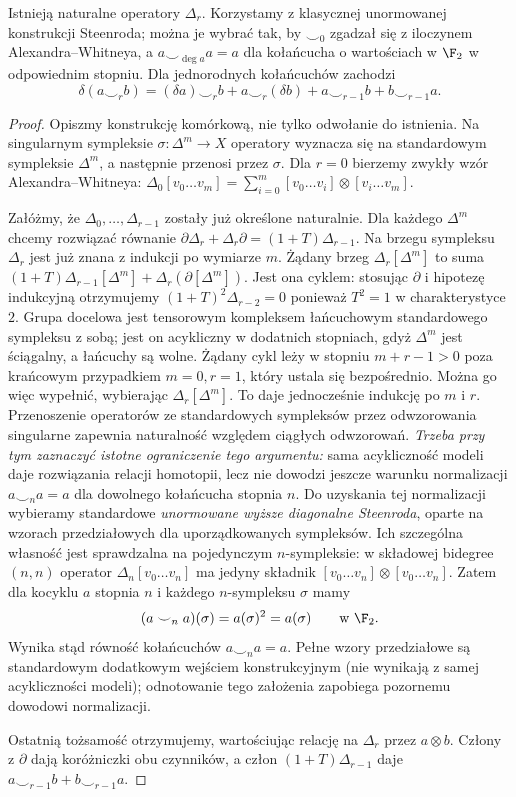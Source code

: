 \begin{lemat}
\label{lem:cup-i-v7}
Istnieją naturalne operatory $\Delta_r$. Korzystamy
z klasycznej unormowanej konstrukcji Steenroda; można je
wybrać tak, by $\smile_0$ zgadzał się z iloczynem
Alexandra--Whitneya, a $a\smile_{\deg a}a=a$
dla kołańcucha o wartościach w $\F_2$ w odpowiednim
stopniu. Dla jednorodnych kołańcuchów zachodzi
\[
\delta(a\smile_r b)=(\delta a)\smile_r b
+a\smile_r(\delta b)+a\smile_{r-1}b+b\smile_{r-1}a.
\]
\end{lemat}
\begin{proof}
Opiszmy konstrukcję komórkową, nie tylko odwołanie
do istnienia. Na singularnym sympleksie $\sigma:\Delta^m\to X$
operatory wyznacza się na standardowym sympleksie
$\Delta^m$, a następnie przenosi przez $\sigma$.
Dla $r=0$ bierzemy zwykły wzór Alexandra--Whitneya:
\(\Delta_0[v_0\dots v_m]=
\sum_{i=0}^m[v_0\dots v_i]\otimes[v_i\dots v_m]\).

Załóżmy, że $\Delta_0,\ldots,\Delta_{r-1}$
zostały już określone naturalnie. Dla każdego
$\Delta^m$ chcemy rozwiązać równanie
$\partial\Delta_r+\Delta_r\partial=(1+T)\Delta_{r-1}$.
Na brzegu sympleksu $\Delta_r$ jest już znana
z indukcji po wymiarze $m$. Żądany brzeg
$\Delta_r[\Delta^m]$ to suma
$(1+T)\Delta_{r-1}[\Delta^m]
+\Delta_r(\partial[\Delta^m])$.
Jest ona cyklem: stosując $\partial$ i hipotezę
indukcyjną otrzymujemy $(1+T)^2\Delta_{r-2}=0$
ponieważ $T^2=1$ w charakterystyce $2$.
Grupa docelowa jest tensorowym kompleksem
łańcuchowym standardowego sympleksu z sobą;
jest on acykliczny w dodatnich stopniach, gdyż
$\Delta^m$ jest ściągalny, a łańcuchy są wolne.
Żądany cykl leży w stopniu $m+r-1>0$
poza krańcowym przypadkiem $m=0,r=1$,
który ustala się bezpośrednio. Można go więc
wypełnić, wybierając $\Delta_r[\Delta^m]$.
To daje jednocześnie indukcję po $m$ i $r$.
Przenoszenie operatorów ze standardowych sympleksów przez
odwzorowania singularne zapewnia naturalność względem
ciągłych odwzorowań. \emph{Trzeba przy tym zaznaczyć
istotne ograniczenie tego argumentu:} sama acykliczność
modeli daje rozwiązania relacji homotopii, lecz nie dowodzi
jeszcze warunku normalizacji
$a\smile_n a=a$ dla dowolnego kołańcucha stopnia $n$.
Do uzyskania tej normalizacji wybieramy standardowe
\emph{unormowane wyższe diagonalne Steenroda}, oparte
na wzorach przedziałowych dla uporządkowanych sympleksów.
Ich szczególna własność jest sprawdzalna na pojedynczym
$n$-sympleksie: w składowej bidegree $(n,n)$ operator
$\Delta_n[v_0\ldots v_n]$ ma jedyny składnik
$[v_0\ldots v_n]\otimes[v_0\ldots v_n]$.
Zatem dla kocyklu $a$ stopnia $n$ i każdego
$n$-sympleksu $\sigma$ mamy
\[
 (a\smile_n a)(\sigma)=a(\sigma)^2=a(\sigma)
 \qquad\text{w }\F_2.
\]
Wynika stąd równość kołańcuchów $a\smile_n a=a$.
Pełne wzory przedziałowe są standardowym dodatkowym
wejściem konstrukcyjnym (nie wynikają z samej
acykliczności modeli); odnotowanie tego założenia
zapobiega pozornemu dowodowi normalizacji.

Ostatnią tożsamość otrzymujemy, wartościując relację
na $\Delta_r$ przez $a\otimes b$. Człony
z $\partial$ dają koróżniczki obu czynników,
a człon $(1+T)\Delta_{r-1}$ daje
$a\smile_{r-1}b+b\smile_{r-1}a$.
\end{proof}

